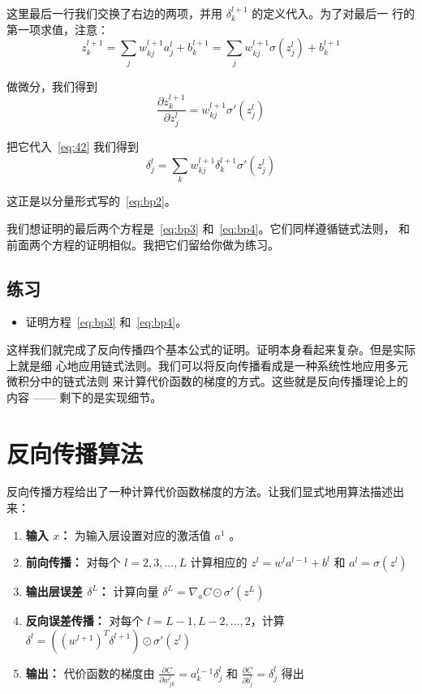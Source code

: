 这里最后一行我们交换了右边的两项，并用 $\delta^{l+1}_k$ 的定义代入。为了对最后一
行的第一项求值，注意：
\begin{equation}
  z^{l+1}_k = \sum_j w^{l+1}_{kj} a^l_j +b^{l+1}_k = \sum_j w^{l+1}_{kj} \sigma(z^l_j) +b^{l+1}_k
\label{eq:43}\tag{43}
\end{equation}

做微分，我们得到
\begin{equation}
  \frac{\partial z^{l+1}_k}{\partial z^l_j} = w^{l+1}_{kj} \sigma'(z^l_j)
\label{eq:44}\tag{44}
\end{equation}

把它代入~\eqref{eq:42} 我们得到
\begin{equation}
  \delta^l_j = \sum_k w^{l+1}_{kj}  \delta^{l+1}_k \sigma'(z^l_j)
\label{eq:45}\tag{45}
\end{equation}

这正是以分量形式写的~\eqref{eq:bp2}。

我们想证明的最后两个方程是~\eqref{eq:bp3} 和~\eqref{eq:bp4}。它们同样遵循链式法则，
和前面两个方程的证明相似。我把它们留给你做为练习。

\subsection*{练习}

\begin{itemize}
\item 证明方程~\eqref{eq:bp3} 和~\eqref{eq:bp4}。
\end{itemize}

这样我们就完成了反向传播四个基本公式的证明。证明本身看起来复杂。但是实际上就是细
心地应用链式法则。我们可以将反向传播看成是一种系统性地应用多元微积分中的链式法则
来计算代价函数的梯度的方式。这些就是反向传播理论上的内容 —— 剩下的是实现细节。

\section{反向传播算法}
\label{sec:the_backpropagation_algorithm}

反向传播方程给出了一种计算代价函数梯度的方法。让我们显式地用算法描述出来：

\begin{enumerate}
\item \textbf{输入 $x$：} 为输入层设置对应的激活值 $a^{1}$ 。
\item \textbf{前向传播：} 对每个 $l=2,3,...,L$ 计算相应的 $z^l = w^la^{l-1} +
  b^l$ 和 $a^l = \sigma(z^l)$
\item \textbf{输出层误差 $\delta^L$：} 计算向量 $\delta^L = \nabla_a C \odot
  \sigma'(z^L)$
\item \textbf{反向误差传播：} 对每个 $l=L-1, L-2,...,2$，计算
  $\delta^l = ((w^{l+1})^T\delta^{l+1})\odot \sigma'(z^l)$
\item \textbf{输出：} 代价函数的梯度由 $\frac{\partial C}{\partial w^l_{jk}} = a^{l-1}_k \delta^l_j$ 和 $\frac{\partial C}{\partial b_j^l} = \delta_j^l$ 得出
\end{enumerate}

